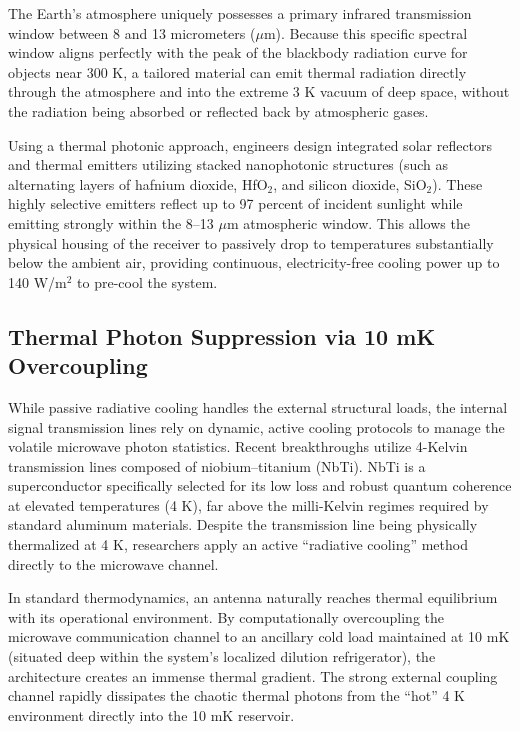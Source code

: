 \documentclass[11pt,a4paper]{article}
\begin{document}
The Earth's atmosphere uniquely possesses a primary infrared transmission window between 8 and 13 micrometers ($\mu$m).\cite{ref45} Because this specific spectral window aligns perfectly with the peak of the blackbody radiation curve for objects near 300 K, a tailored material can emit thermal radiation directly through the atmosphere and into the extreme 3 K vacuum of deep space, without the radiation being absorbed or reflected back by atmospheric gases.\cite{ref41}

Using a thermal photonic approach, engineers design integrated solar reflectors and thermal emitters utilizing stacked nanophotonic structures (such as alternating layers of hafnium dioxide, HfO$_2$, and silicon dioxide, SiO$_2$).\cite{ref45} These highly selective emitters reflect up to 97 percent of incident sunlight while emitting strongly within the 8--13 $\mu$m atmospheric window.\cite{ref50} This allows the physical housing of the receiver to passively drop to temperatures substantially below the ambient air, providing continuous, electricity-free cooling power up to 140 W/m$^2$ to pre-cool the system.\cite{ref41}

\subsection{Thermal Photon Suppression via 10 mK Overcoupling}

While passive radiative cooling handles the external structural loads, the internal signal transmission lines rely on dynamic, active cooling protocols to manage the volatile microwave photon statistics. Recent breakthroughs utilize 4-Kelvin transmission lines composed of niobium--titanium (NbTi).\cite{ref44} NbTi is a superconductor specifically selected for its low loss and robust quantum coherence at elevated temperatures (4 K), far above the milli-Kelvin regimes required by standard aluminum materials.\cite{ref44} Despite the transmission line being physically thermalized at 4 K, researchers apply an active ``radiative cooling'' method directly to the microwave channel.\cite{ref44}

In standard thermodynamics, an antenna naturally reaches thermal equilibrium with its operational environment. By computationally overcoupling the microwave communication channel to an ancillary cold load maintained at 10 mK (situated deep within the system's localized dilution refrigerator), the architecture creates an immense thermal gradient.\cite{ref6} The strong external coupling channel rapidly dissipates the chaotic thermal photons from the ``hot'' 4 K environment directly into the 10 mK reservoir.\cite{ref43}
\end{document}
